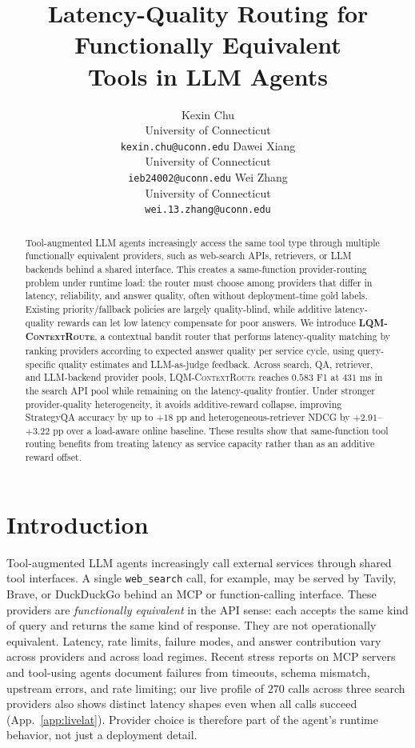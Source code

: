 \documentclass[11pt]{article}
\title{Latency-Quality Routing for Functionally Equivalent\\
Tools in LLM Agents}
\author{
Kexin Chu \\
University of Connecticut \\
\texttt{kexin.chu@uconn.edu}
\And
Dawei Xiang \\
University of Connecticut \\
\texttt{ieb24002@uconn.edu}
\And
Wei Zhang \\
University of Connecticut \\
\texttt{wei.13.zhang@uconn.edu}
}
\newcommand{\lqmcr}{\textsc{LQM-ContextRoute}}
\begin{document}
\maketitle

\begin{abstract}
Tool-augmented LLM agents increasingly access the same tool type through multiple functionally equivalent providers, such as web-search APIs, retrievers, or LLM backends behind a shared interface. This creates a same-function provider-routing problem under runtime load: the router must choose among providers that differ in latency, reliability, and answer quality, often without deployment-time gold labels. Existing priority/fallback policies are largely quality-blind, while additive latency-quality rewards can let low latency compensate for poor answers. We introduce \textbf{\lqmcr{}}, a contextual bandit router that performs latency-quality matching by ranking providers according to expected answer quality per service cycle, using query-specific quality estimates and LLM-as-judge feedback. Across search, QA, retriever, and LLM-backend provider pools, \lqmcr{} reaches $0.583$ F1 at $431$ ms in the search API pool while remaining on the latency-quality frontier. Under stronger provider-quality heterogeneity, it avoids additive-reward collapse, improving StrategyQA accuracy by up to $+18$ pp and heterogeneous-retriever NDCG by $+2.91$--$+3.22$ pp over a load-aware online baseline. These results show that same-function tool routing benefits from treating latency as service capacity rather than as an additive reward offset.
\end{abstract}

\section{Introduction}
\label{sec:intro}

Tool-augmented LLM agents increasingly call external services through shared tool interfaces. A single \texttt{web\_search} call, for example, may be served by Tavily, Brave, or DuckDuckGo behind an MCP \citep{mcp_spec} or function-calling interface. These providers are \emph{functionally equivalent} in the API sense: each accepts the same kind of query and returns the same kind of response. They are not operationally equivalent. Latency, rate limits, failure modes, and answer contribution vary across providers and across load regimes. Recent stress reports on MCP servers and tool-using agents \citep{digitalapplied2026mcp,reliabilitybench2026} document failures from timeouts, schema mismatch, upstream errors, and rate limiting; our live profile of $270$ calls across three search providers also shows distinct latency shapes even when all calls succeed (App.~\ref{app:livelat}). Provider choice is therefore part of the agent's runtime behavior, not just a deployment detail.
\end{document}
